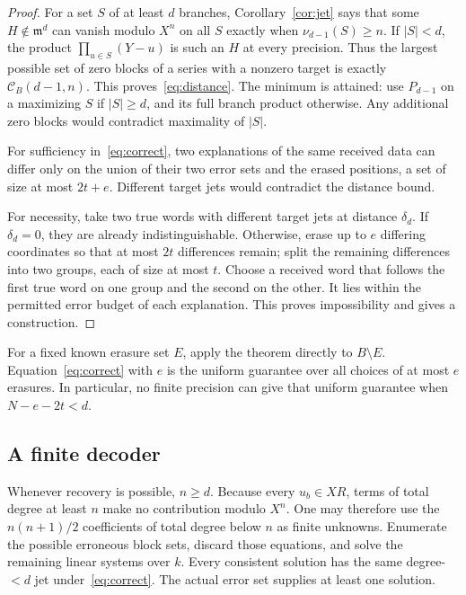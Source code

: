 \documentclass[11pt]{article}
\theoremstyle{definition}
\newcommand{\m}{\mathfrak m}
\newcommand{\capv}{\mathcal C}
\begin{document}
\begin{proof}
For a set $S$ of at least $d$ branches, Corollary~\ref{cor:jet} says that some $H\notin\m^d$ can vanish modulo $X^n$ on all $S$ exactly when $\nu_{d-1}(S)\ge n$. If $|S|<d$, the product $\prod_{u\in S}(Y-u)$ is such an $H$ at every precision. Thus the largest possible set of zero blocks of a series with a nonzero target is exactly $\capv_B(d-1,n)$. This proves~\eqref{eq:distance}. The minimum is attained: use $P_{d-1}$ on a maximizing $S$ if $|S|\ge d$, and its full branch product otherwise. Any additional zero blocks would contradict maximality of $|S|$.

For sufficiency in~\eqref{eq:correct}, two explanations of the same received data can differ only on the union of their two error sets and the erased positions, a set of size at most $2t+e$. Different target jets would contradict the distance bound.

For necessity, take two true words with different target jets at distance $\delta_d$. If $\delta_d=0$, they are already indistinguishable. Otherwise, erase up to $e$ differing coordinates so that at most $2t$ differences remain; split the remaining differences into two groups, each of size at most $t$. Choose a received word that follows the first true word on one group and the second on the other. It lies within the permitted error budget of each explanation. This proves impossibility and gives a construction.
\end{proof}

For a fixed known erasure set $E$, apply the theorem directly to $B\setminus E$. Equation~\eqref{eq:correct} with $e$ is the uniform guarantee over all choices of at most $e$ erasures. In particular, no finite precision can give that uniform guarantee when $N-e-2t<d$.

\subsection{A finite decoder}

Whenever recovery is possible, $n\ge d$. Because every $u_b\in XR$, terms of total degree at least $n$ make no contribution modulo $X^n$. One may therefore use the $n(n+1)/2$ coefficients of total degree below $n$ as finite unknowns. Enumerate the possible erroneous block sets, discard those equations, and solve the remaining linear systems over $k$. Every consistent solution has the same degree-$<d$ jet under~\eqref{eq:correct}. The actual error set supplies at least one solution.
\end{document}
